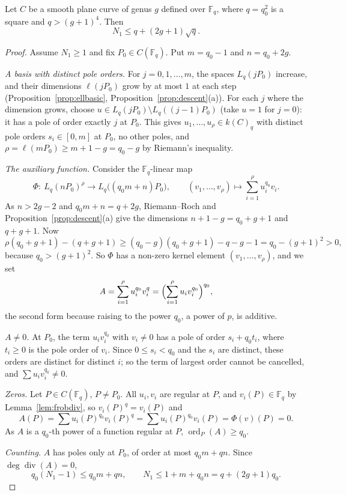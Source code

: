 \begin{theorem}\label{thm:bombieri}
Let $C$ be a smooth plane curve of genus $g$ defined over $\mathbb F_q$, where $q=q_0^2$ is a square and $q>(g+1)^4$. Then
\[
N_1\le q+(2g+1)\sqrt q.
\]
\end{theorem}
\begin{proof}
Assume $N_1\ge1$ and fix $P_0\in C(\mathbb F_q)$. Put $m=q_0-1$ and $n=q_0+2g$.

\emph{A basis with distinct pole orders.} For $j=0,1,\dots,m$, the spaces $L_q(jP_0)$ increase, and their dimensions $\ell(jP_0)$ grow by at most $1$ at each step
(Proposition~\ref{prop:ellbasic}, Proposition~\ref{prop:descent}(a)). For each $j$ where the dimension grows, choose $u\in L_q(jP_0)\setminus L_q((j-1)P_0)$
(take $u=1$ for $j=0$): it has a pole of order exactly $j$ at $P_0$. This gives $u_1,\dots,u_\rho\in k(C)_q$ with distinct pole orders $s_i\in[0,m]$ at $P_0$, no
other poles, and $\rho=\ell(mP_0)\ge m+1-g=q_0-g$ by Riemann's inequality.

\emph{The auxiliary function.} Consider the $\mathbb F_q$-linear map
\[
\Phi:\ L_q(nP_0)^\rho\to L_q\bigl((q_0m+n)P_0\bigr),\qquad(v_1,\dots,v_\rho)\mapsto\sum_{i=1}^\rho u_i^{q_0}v_i.
\]
As $n>2g-2$ and $q_0m+n=q+2g$, Riemann--Roch and Proposition~\ref{prop:descent}(a) give the dimensions $n+1-g=q_0+g+1$ and $q+g+1$. Now
\[
\rho(q_0+g+1)-(q+g+1)\ge(q_0-g)(q_0+g+1)-q-g-1=q_0-(g+1)^2>0,
\]
because $q_0>(g+1)^2$. So $\Phi$ has a non-zero kernel element $(v_1,\dots,v_\rho)$, and we set
\[
A=\sum_{i=1}^\rho u_i^{q_0}v_i^{q}=\Bigl(\sum_{i=1}^\rho u_iv_i^{q_0}\Bigr)^{q_0},
\]
the second form because raising to the power $q_0$, a power of $p$, is additive.

\emph{$A\ne0$.} At $P_0$, the term $u_iv_i^{q_0}$ with $v_i\ne0$ has a pole of order $s_i+q_0t_i$, where $t_i\ge0$ is the pole order of $v_i$. Since $0\le s_i<q_0$
and the $s_i$ are distinct, these orders are distinct for distinct $i$; so the term of largest order cannot be cancelled, and $\sum u_iv_i^{q_0}\ne0$.

\emph{Zeros.} Let $P\in C(\mathbb F_q)$, $P\ne P_0$. All $u_i,v_i$ are regular at $P$, and $v_i(P)\in\mathbb F_q$ by Lemma~\ref{lem:frobdiv}, so $v_i(P)^q=v_i(P)$
and
\[
A(P)=\sum u_i(P)^{q_0}v_i(P)^q=\sum u_i(P)^{q_0}v_i(P)=\Phi(v)(P)=0.
\]
As $A$ is a $q_0$-th power of a function regular at $P$, $\operatorname{ord}_P(A)\ge q_0$.

\emph{Counting.} $A$ has poles only at $P_0$, of order at most $q_0m+qn$. Since $\deg\operatorname{div}(A)=0$,
\[
q_0(N_1-1)\le q_0m+qn,\qquad N_1\le1+m+q_0n=q+(2g+1)q_0.
\]
\end{proof}

